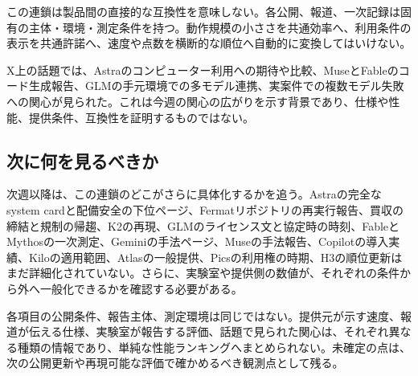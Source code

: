 この連鎖は製品間の直接的な互換性を意味しない。各公開、報道、一次記録は固有の主体・環境・測定条件を持つ。動作規模の小ささを共通効率へ、利用条件の表示を共通許諾へ、速度や点数を横断的な順位へ自動的に変換してはいけない。

\begin{communitynote}
X上の話題では、Astraのコンピューター利用への期待や比較、MuseとFableのコード生成報告、GLMの手元環境での多モデル連携、実案件での複数モデル失敗への関心が見られた。これは今週の関心の広がりを示す背景であり、仕様や性能、提供条件、互換性を証明するものではない\cite{w36community}。
\end{communitynote}

\subsection*{次に何を見るべきか}
次週以降は、この連鎖のどこがさらに具体化するかを追う。Astraの完全なsystem cardと配備安全の下位ページ、Fermatリポジトリの再実行報告、買収の締結と規制の帰趨、K2の再現、GLMのライセンス文と協定時の時刻、FableとMythosの一次測定、Geminiの手法ページ、Museの手法報告、Copilotの導入実績、Kiloの適用範囲、Atlasの一般提供、Picsの利用権の時期、H3の順位更新はまだ詳細化されていない。さらに、実験室や提供側の数値が、それぞれの条件から外へ一般化できるかを確認する必要がある。

\begin{claimboundary}[この総括の読み方]
各項目の公開条件、報告主体、測定環境は同じではない。提供元が示す速度、報道が伝える仕様、実験室が報告する評価、話題で見られた関心は、それぞれ異なる種類の情報であり、単純な性能ランキングへまとめられない。未確定の点は、次の公開更新や再現可能な評価で確かめるべき観測点として残る。
\end{claimboundary}
